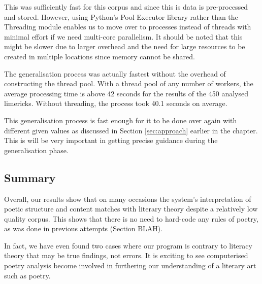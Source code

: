 This was sufficiently fast for this corpus and since this is data is pre-processed and stored. However, using Python's Pool Executor library rather than the Threading module enables us to move over to processes instead of threads with minimal effort if we need multi-core parallelism. It should be noted that this might be slower due to larger overhead and the need for large resources to be created in multiple locations since memory cannot be shared.

The generalisation process was actually fastest without the overhead of constructing the thread pool. With a thread pool of any number of workers, the average processing time is above 42 seconds for the results of the 450 analysed limericks. Without threading, the process took 40.1 seconds on average.

This generalisation process is fast enough for it to be done over again with different given values as discussed in Section \ref{sec:approach} earlier in the chapter. This is will be very important in getting precise guidance during the generalisation phase.

\subsection{Summary}
Overall, our results show that on many occasions the system's interpretation of poetic structure and content matches with literary theory despite a relatively low quality corpus. This shows that there is no need to hard-code any rules of poetry, as was done in previous attempts (Section BLAH).

In fact, we have even found two cases where our program is contrary to literacy theory that may be true findings, not errors. It is exciting to see computerised poetry analysis become involved in furthering our understanding of a literary art such as poetry.

